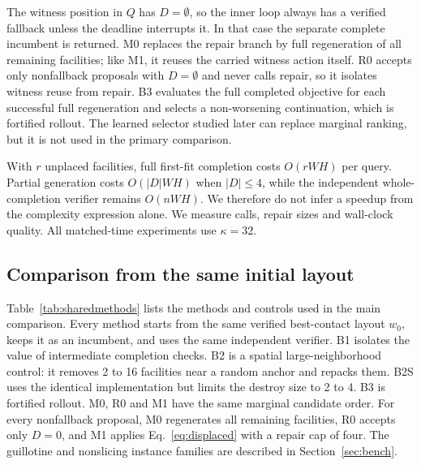 \documentclass[preprint,12pt,authoryear]{elsarticle}
\begin{document}
The witness position in $Q$ has $D=\emptyset$, so the inner loop always has a
verified fallback unless the deadline interrupts it. In that case the separate
complete incumbent is returned. M0 replaces the repair branch by full
regeneration of all remaining facilities; like M1, it reuses the carried
witness action itself. R0 accepts only nonfallback proposals with $D=\emptyset$
and never calls repair, so it isolates witness reuse from repair. B3 evaluates the full completed
objective for each successful full regeneration and selects a non-worsening
continuation, which is fortified rollout. The learned selector studied later can
replace marginal ranking, but it is not used in the primary comparison.

With $r$ unplaced facilities, full first-fit completion costs $O(rWH)$ per
query. Partial generation costs $O(|D|WH)$ when $|D|\le4$, while the independent
whole-completion verifier remains $O(nWH)$. We therefore do not infer a speedup
from the complexity expression alone. We measure calls, repair sizes and
wall-clock quality. All matched-time experiments use $\kappa=32$.

\subsection{Comparison from the same initial layout}
\label{sec:sharedcomparison}

Table~\ref{tab:sharedmethods} lists the methods and controls used in the main
comparison. Every method starts
from the same verified best-contact layout $w_0$, keeps it as an incumbent, and
uses the same independent verifier. B1 isolates the value of intermediate
completion checks. B2 is a spatial large-neighborhood control: it removes 2 to
16 facilities near a random anchor and repacks them. B2S uses the identical
implementation but limits the destroy size to 2 to 4. B3 is fortified rollout.
M0, R0 and M1 have the same marginal candidate order. For every nonfallback
proposal, M0 regenerates all remaining facilities, R0 accepts only $D=0$, and
M1 applies Eq.~\eqref{eq:displaced} with a repair cap of four.
The guillotine and nonslicing instance families are described in
Section~\ref{sec:bench}.
\end{document}
